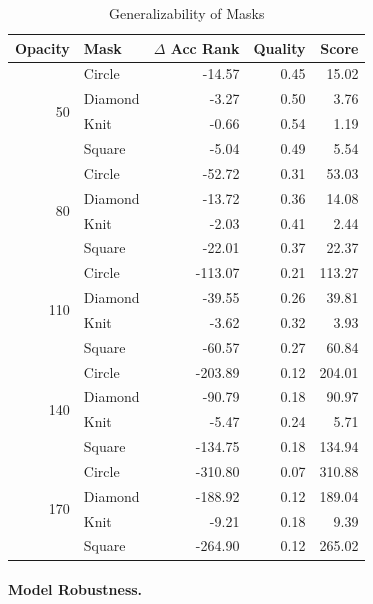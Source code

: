 \documentclass[a4paper, oneside]{discothesis}
\begin{document}
\begin{table}[h]
    \centering
    \begin{tabular}{rlrrr}
        \toprule
        Opacity & Mask & $\Delta$ Acc Rank & Quality & Score \\
        \midrule
        \multirow{4}{*}{50}
            & Circle & -14.57 & 0.45 & 15.02 \\
            & Diamond & -3.27 & 0.50 & 3.76 \\
            & Knit & -0.66 & 0.54 & 1.19 \\
            & Square & -5.04 & 0.49 & 5.54 \\
        \midrule
        \multirow{4}{*}{80}
            & Circle & -52.72 & 0.31 & 53.03 \\
            & Diamond & -13.72 & 0.36 & 14.08 \\
            & Knit & -2.03 & 0.41 & 2.44 \\
            & Square & -22.01 & 0.37 & 22.37 \\
        \midrule
        \multirow{4}{*}{110}
            & Circle & -113.07 & 0.21 & 113.27 \\
            & Diamond & -39.55 & 0.26 & 39.81 \\
            & Knit & -3.62 & 0.32 & 3.93 \\
            & Square & -60.57 & 0.27 & 60.84 \\
        \midrule
        \multirow{4}{*}{140}
            & Circle & -203.89 & 0.12 & 204.01 \\
            & Diamond & -90.79 & 0.18 & 90.97 \\
            & Knit & -5.47 & 0.24 & 5.71 \\
            & Square & -134.75 & 0.18 & 134.94 \\
        \midrule
        \multirow{4}{*}{170}
            & Circle & -310.80 & 0.07 & 310.88 \\
            & Diamond & -188.92 & 0.12 & 189.04 \\
            & Knit & -9.21 & 0.18 & 9.39 \\
            & Square & -264.90 & 0.12 & 265.02 \\
        \bottomrule
    \end{tabular}
    \vspace*{0.1cm}
    \caption{Generalizability of Masks}
    \label{tab:generalizability}
\end{table}
	
\paragraph{Model Robustness.}
\end{document}
